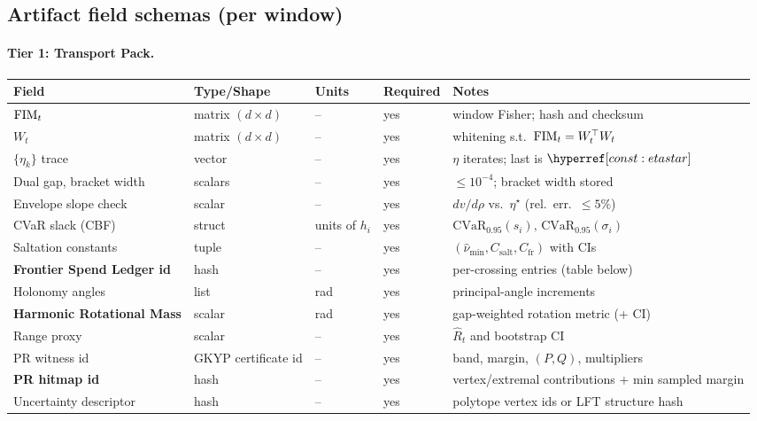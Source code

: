 \subsection{Artifact field schemas (per window)}\label{app:artifact-schemas}

\paragraph{Tier 1: Transport Pack.}
\begin{center}
\renewcommand{\arraystretch}{1.12}
\begin{tabularx}{\textwidth}{@{} l l l X X @{}}
\toprule
\textbf{Field} & \textbf{Type/Shape} & \textbf{Units} & \textbf{Required} & \textbf{Notes} \\
\midrule
$\mathrm{FIM}_t$ & matrix $(d\times d)$ & – & yes & window Fisher; hash and checksum \\
$W_t$ & matrix $(d\times d)$ & – & yes & whitening s.t.\ $\mathrm{FIM}_t=W_t^\top W_t$ \\
$\{\eta_k\}$ trace & vector & – & yes & $\eta$ iterates; last is $\constref{etastar}$ \\
Dual gap, bracket width & scalars & – & yes & $\le 10^{-4}$; bracket width stored \\
Envelope slope check & scalar & – & yes & $dv/d\rho$ vs.\ $\eta^\star$ (rel.\ err.\ $\le 5\%$) \\
CVaR slack (CBF) & struct & units of $h_i$ & yes & $\mathrm{CVaR}_{0.95}(s_i),\,\mathrm{CVaR}_{0.95}(\sigma_i)$ \\
Saltation constants & tuple & – & yes & $(\hat\nu_{\min},C_{\mathrm{salt}},C_{\mathrm{fr}})$ with CIs \\
\textbf{Frontier Spend Ledger id} & hash & – & yes & per-crossing entries (table below) \\
Holonomy angles & list & rad & yes & principal-angle increments \\
\textbf{Harmonic Rotational Mass} & scalar & rad & yes & gap-weighted rotation metric (+ CI) \\
Range proxy & scalar & – & yes & $\widehat R_t$ and bootstrap CI \\
PR witness id & GKYP certificate id & – & yes & band, margin, $(P,Q)$, multipliers \\
\textbf{PR hitmap id} & hash & – & yes & vertex/extremal contributions + min sampled margin \\
Uncertainty descriptor & hash & – & yes & polytope vertex ids or LFT structure hash \\

\end{tabularx}
\end{center}
